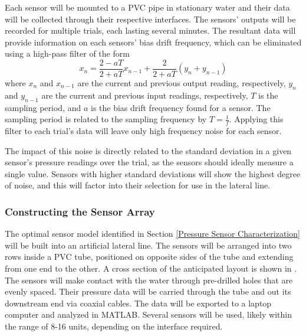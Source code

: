     Each sensor will be mounted to a PVC pipe in stationary water and their data will be collected through their respective interfaces. The sensors' outputs will be recorded for multiple trials, each lasting several minutes. The resultant data will provide information on each sensors' bias drift frequency, which can be eliminated using a high-pass filter of the form
    \begin{equation} \label{Eq:High pass filter}
    x_n=\frac{2-aT}{2+aT}x_{n-1}+\frac{2}{2+aT}(y_n+y_{n-1})
    \end{equation} 
    where \(x_n\) and \(x_{n-1}\) are the current and previous output reading, respectively, \(y_n\) and \(y_{n-1}\) are the current and previous input readings, respectively, \(T\) is the sampling period, and \(a\) is the bias drift frequency found for a sensor. The sampling period is related to the sampling frequency by \(T=\frac{1}{f}\). Applying this filter to each trial's data will leave only high frequency noise for each sensor.
    
    The impact of this noise is directly related to the standard deviation in a given sensor's pressure readings over the trial, as the sensors should ideally measure a single value. Sensors with higher standard deviations will show the highest degree of noise, and this will factor into their selection for use in the lateral line.


\subsubsection{Constructing the Sensor Array} \label{Constructing the Sensor Array}
    
    The optimal sensor model identified in Section \ref{Pressure Sensor Characterization} will be built into an artificial lateral line. The sensors will be arranged into two rows inside a PVC tube, positioned on opposite sides of the tube and extending from one end to the other. A cross section of the anticipated layout is shown in . The sensors will make contact with the water through pre-drilled holes that are evenly spaced. Their pressure data will be carried through the tube and out its downstream end via coaxial cables. The data will be exported to a laptop computer and analyzed in MATLAB. Several sensors will be used, likely within the range of 8-16 units, depending on the interface required.
    
